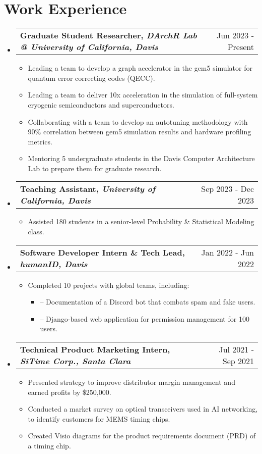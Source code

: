 \documentclass[letterpaper,10pt]{article}
\makeatletter
\newcommand{\resumeItem}[1]{\item\small{#1} \vspace{-3pt}}
\newcommand{\resumeSubheadingSmall}[2]{
\vspace{-1pt}\item
  \begin{tabular*}{0.97\textwidth}[t]{l@{\extracolsep{\fill}}r}
    \textbf{#1} & #2 \\
  \end{tabular*}\vspace{-7pt}
}
\newcommand{\resumeSubHeadingList}{\begin{itemize}[leftmargin=0.15in, label={}, labelsep=0.15in]}
\newcommand{\resumeJustifiedList}{\begin{itemize}[leftmargin=0.3in, label=\textbullet, labelsep=0.1in]}
\newcommand{\resumeSubHeadingListEnd}{\end{itemize}}
\newcommand{\resumeItemDash}[1]{\item\small{\hspace{-0.1cm} -- #1} \vspace{-3pt}}
\makeatother
\begin{document}
\section{Work Experience}
{\normalsize
\resumeSubHeadingList
    \resumeSubheadingSmall
        {Graduate Student Researcher, \textit{DArchR Lab @ University of California, Davis}}{Jun 2023 - Present}
        \resumeJustifiedList
            \resumeItem{Leading a team to develop a graph accelerator in the gem5 simulator for quantum error correcting codes (QECC).}
            \resumeItem{Leading a team to deliver 10x acceleration in the simulation of full-system cryogenic semiconductors and superconductors.}
            \resumeItem{Collaborating with a team to develop an autotuning methodology with 90\% correlation between gem5 simulation results and hardware profiling metrics.}
            \resumeItem{Mentoring 5 undergraduate students in the Davis Computer Architecture Lab to prepare them for graduate research.}
    \resumeSubHeadingListEnd
  \resumeSubheadingSmall
      {Teaching Assistant, \textit{University of California, Davis}}{Sep 2023 - Dec 2023}
      \resumeJustifiedList
          \resumeItem{Assisted 180 students in a senior-level Probability \& Statistical Modeling class.}
      \resumeSubHeadingListEnd
  \resumeSubheadingSmall
  {Software Developer Intern \& Tech Lead, \textit{humanID, Davis}}{Jan 2022 - Jun 2022}
  \resumeJustifiedList
      \resumeItem{Completed 10 projects with global teams, including:}
      \resumeSubHeadingList
        \resumeItemDash{Documentation of a Discord bot that combats spam and fake users.}
        \resumeItemDash{Django-based web application for permission management for 100 users.}
      \resumeSubHeadingListEnd
  \resumeSubHeadingListEnd

  \resumeSubheadingSmall
      {Technical Product Marketing Intern, \textit{SiTime Corp., Santa Clara}}{Jul 2021 - Sep 2021}
      \resumeJustifiedList
          \resumeItem{Presented strategy to improve distributor margin management and earned profits by \$250,000.}
          \resumeItem{Conducted a market survey on optical transceivers used in AI networking, to identify customers for MEMS timing chips.}
          \resumeItem{Created Visio diagrams for the product requirements document (PRD) of a timing chip.}
      \resumeSubHeadingListEnd
\resumeSubHeadingListEnd
}
\end{document}

